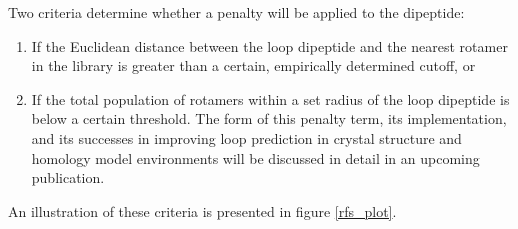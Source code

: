 Two criteria determine whether a penalty will be applied to the dipeptide: 
\begin{enumerate}
\item If the Euclidean distance between the loop dipeptide and the nearest rotamer in the library is greater than a certain, empirically determined cutoff, or
\item If the total population of rotamers within a set radius of the loop dipeptide is below a certain threshold.
The form of this penalty term, its implementation, and its successes in improving loop prediction in crystal structure and homology model environments will be discussed in detail in an upcoming publication.
\end{enumerate}
An illustration of these criteria is presented in figure \ref{rfs_plot}.
